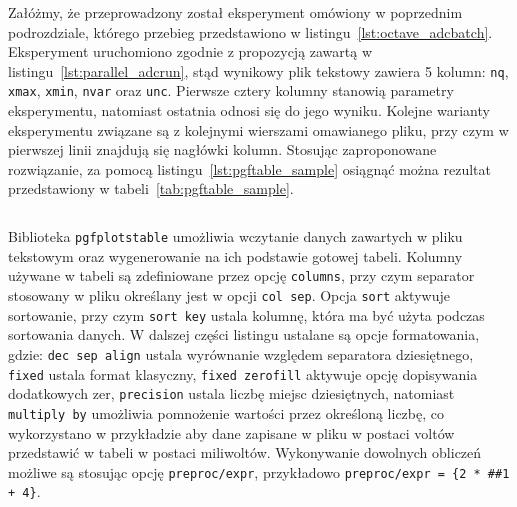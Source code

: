 Załóżmy, że przeprowadzony został eksperyment omówiony w poprzednim podrozdziale, którego przebieg przedstawiono w listingu~\ref{lst:octave_adcbatch}. Eksperyment uruchomiono zgodnie z propozycją zawartą w listingu~\ref{lst:parallel_adcrun}, stąd wynikowy plik tekstowy zawiera 5 kolumn: \verb|nq|, \verb|xmax|, \verb|xmin|, \verb|nvar| oraz \verb|unc|. Pierwsze cztery kolumny stanowią parametry eksperymentu, natomiast ostatnia odnosi się do jego wyniku. Kolejne warianty eksperymentu związane są z kolejnymi wierszami omawianego pliku, przy czym w pierwszej linii znajdują się nagłówki kolumn. Stosując zaproponowane rozwiązanie, za pomocą listingu~\ref{lst:pgftable_sample} osiągnąć można rezultat przedstawiony w tabeli~\ref{tab:pgftable_sample}.

\begin{table}[htb]
\end{table}

\begin{listing}[p]
\inputminted{latex}{skrypty/pgftable_sample.tex}
\end{listing}

Biblioteka \texttt{pgfplotstable} umożliwia wczytanie danych zawartych w pliku tekstowym oraz wygenerowanie na ich podstawie gotowej tabeli. Kolumny używane w tabeli są zdefiniowane przez opcję \verb|columns|, przy czym separator stosowany w pliku określany jest w opcji \verb|col sep|. Opcja \verb|sort| aktywuje sortowanie, przy czym \verb|sort key| ustala kolumnę, która ma być użyta podczas sortowania danych. W dalszej części listingu ustalane są opcje formatowania, gdzie: \verb|dec sep align| ustala wyrównanie względem separatora dziesiętnego, \verb|fixed| ustala format klasyczny, \verb|fixed zerofill| aktywuje opcję dopisywania dodatkowych zer, \verb|precision| ustala liczbę miejsc dziesiętnych, natomiast \verb|multiply by| umożliwia pomnożenie wartości przez określoną liczbę, co wykorzystano w przykładzie aby dane zapisane w pliku w postaci voltów przedstawić w tabeli w postaci miliwoltów. Wykonywanie dowolnych obliczeń możliwe są stosując opcję \verb|preproc/expr|, przykładowo \verb|preproc/expr = {2 * ##1 + 4}|.

